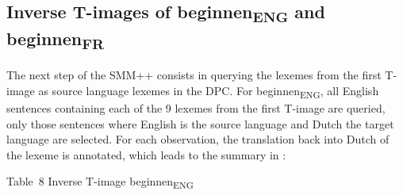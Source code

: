 \subsection{\label{sec:3.6.2}  Inverse T-images of beginnen\textsubscript{ENG} and beginnen\textsubscript{FR}}

The next step of the SMM++ consists in querying the lexemes from the first T-image as source language lexemes in the DPC. For beginnen\textsubscript{ENG}, all English sentences containing each of the 9 lexemes from the first T-image are queried, only those sentences where English is the source language and Dutch the target language are selected. For each observation, the translation back into Dutch of the lexeme is annotated, which leads to the summary in :



Table~8  Inverse T-image beginnen\textsubscript{ENG}


